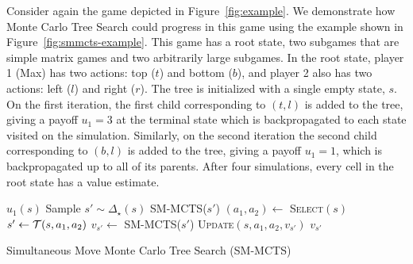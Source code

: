 Consider again the game depicted in Figure~\ref{fig:example}. We demonstrate how Monte Carlo Tree Search
could progress in this game using the example shown in Figure~\ref{fig:smmcts-example}. This game has a root state,
two subgames that are simple matrix games and two arbitrarily large subgames. In the root state, player 1 (Max) has two
actions: top ($t$) and bottom ($b$), and player 2 also has two actions: left ($l$) and right ($r$). The tree is initialized
with a single empty state, $s$. On the first iteration, the first child corresponding to $(t,l)$ is added to the tree,
giving a payoff $u_1 = 3$ at the terminal state which is backpropagated to each state visited on the simulation.
Similarly, on the second iteration the second child corresponding to $(b,l)$ is added to the tree, giving a payoff $u_1 = 1$, which is
backpropagated up to all of its parents.
After four simulations, every cell in the root state has a value estimate.

\begin{algorithm2e}[t]
\small
{}
 {
	\Return $u_1(s)$\;
}
 {
        Sample $s' \sim \Delta_\star(s)$\;
	\Return SM-MCTS($s'$)\;
}
 {
	$(a_1, a_2) \leftarrow$ \textsc{Select}$(s)$\;\label{alg:smmcts:select}
	$s' \leftarrow \mathcal{T}(s,a_1,a_2)$\;
	$v_{s'} \leftarrow $ SM-MCTS($s'$)\;\label{alg:smmcts:reccall}
	\textsc{Update}$(s,a_1,a_2,v_{s'})$\;\label{alg:smmcts:up}
	\Return $v_{s'}$\;
}
\caption{Simultaneous Move Monte Carlo Tree Search (SM-MCTS)}\label{alg:smmcts}
\end{algorithm2e}

